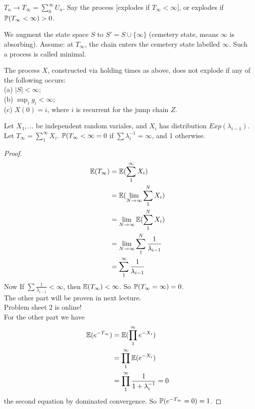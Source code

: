 \documentclass[a4paper]{article}
\begin{document}
$T_n \to T_\infty = \sum_0^\infty U_n$. Say the process [explodes if $T_\infty < \infty]$, or explodes if $\P(T_\infty < \infty) > 0$.

We augment the state space $S$ to $S' = S \cup \{\infty\}$ (cemetery state, means $\infty$ is absorbing). Assume: at $T_\infty$, the chain enters the cemetery state labelled $\infty$. Such a process is called minimal.

\begin{thm}
The process $X$, constructed via holding times as above, does not explode if any of the following occurs:\\
(a) $|S| < \infty$;\\
(b) $\sup_i g_i < \infty$;\\
(c) $X(0) = i$, where $i$ is recurrent for the jump chain $Z$.
\end{thm}

\begin{lemma}
Let $X_1,...$ be independent random variales, and $X_i$ has distribution $Exp(\lambda_{i-1})$. Let $T_\infty = \sum_1^\infty X_i$. $\P(T_\infty < \infty = 0$ if $\sum \lambda_i^{-1} = \infty$, and 1 otherwise.
\begin{proof}
\begin{equation*}
\begin{aligned}
\E(T_\infty) &= \E(\sum_1^\infty X_i)\\
&= \E (\lim_{N \to \infty} \sum_1^N X_i)\\
&= \lim_{N \to \infty} \E(\sum_1^N X_i)\\
&= \lim_{N \to \infty} \sum_1^N \frac{1}{\lambda_{i-1}}\\
&= \sum_1^\infty \frac{1}{\lambda_{i-1}}
\end{aligned}
\end{equation*}
Now If $\sum \frac{1}{\lambda_{i-1}} < \infty$, then $\E(T_\infty) < \infty$. So $\P(T_\infty = \infty) = 0$.\\
The other part will be proven in next lecture.\\
Problem sheet 2 is online!\\
For the other part we have 
\begin{equation*}
\begin{aligned}
\E(e^{-T_\infty}) &= \E(\prod_1^\infty e^{-X_i})\\
&= \prod_1^\infty \E(e^{-X_i})\\
&= \prod_1^\infty \frac{1}{1+\lambda_i^{-1}} = 0
\end{aligned}
\end{equation*}
the second equation by dominated convergence. So $\P(e^{-T_\infty} = 0) = 1$.
\end{proof}
\end{lemma}
\end{document}
